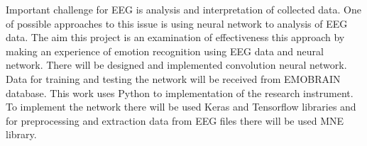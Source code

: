 \documentclass[10pt,journal,compsoc]{IEEEtran}
\begin{document}
Important challenge for EEG is analysis and interpretation of collected data. One of possible approaches to this issue is using neural network to analysis of EEG data. The aim this project is an examination of  effectiveness this approach by making an experience of emotion recognition using EEG data and neural network. There will be designed and implemented convolution neural network. Data for training and testing the network will be received from EMOBRAIN database. This work uses Python to implementation of the research instrument. To implement the network there will be used Keras and Tensorflow libraries and for preprocessing and extraction data from EEG files there will be used MNE library.


 





%
%
\end{document}
